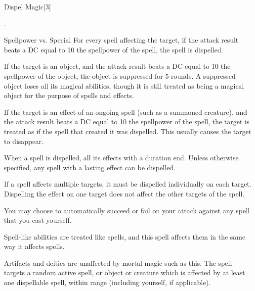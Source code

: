 \begin{spellsection}{Dispel Magic}[3]
    \begin{spellheader}
        .
    \end{spellheader}
    \begin{spellcontent}
        \begin{spelltargetinginfo}
        \end{spelltargetinginfo}
        \begin{spelleffects}
            \begin{spellattack}{Spellpower vs. Special}
                \spelleffect For every spell affecting the target, if the attack result beats a DC equal to 10 \add the spellpower of the spell, the spell is dispelled.

                If the target is an object, and the attack result beats a DC equal to 10 \add the spellpower of the object, the object is suppressed for 5 rounds. A suppressed object loses all its magical abilities, though it is still treated as being a magical object for the purpose of spells and effects.

                If the target is an effect of an ongoing spell (such as a summoned creature), and the attack result beats a DC equal to 10 \add the spellpower of the spell, the target is treated as if the spell that created it was dispelled. This usually causes the target to disappear.
            \end{spellattack}
        \end{spelleffects}
    \end{spellcontent}
    \begin{spellfooter}
        \spellnotes When a spell is dispelled, all its effects with a duration end. Unless otherwise specified, any spell with a lasting effect can be dispelled.

        If a spell affects multiple targets, it must be dispelled individually on each target. Dispelling the effect on one target does not affect the other targets of the spell.

        You may choose to automatically succeed or fail on your attack against any spell that you cast yourself.

        Spell-like abilities are treated like spells, and this spell affects them in the same way it affects spells.

        Artifacts and deities are unaffected by mortal magic such as this.
         The spell targets a random active spell, or object or creature which is affected by at least one dispellable spell, within range (including yourself, if applicable).
    \end{spellfooter}
\end{spellsection}

